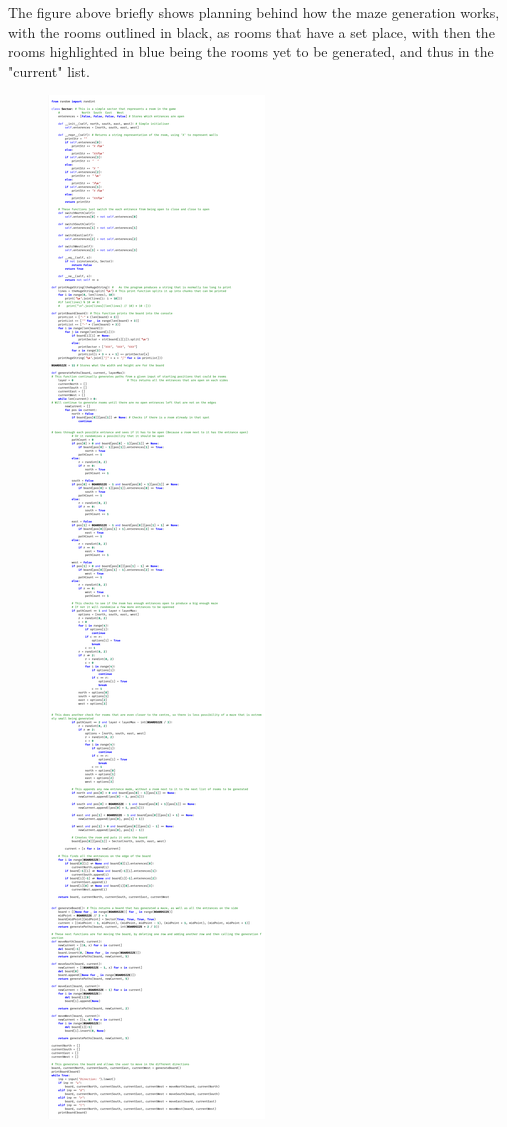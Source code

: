 \documentclass{article}
\begin{document}
            The figure above briefly shows planning behind how the maze generation works, with the rooms outlined in black, as rooms that have a set place, with then the rooms highlighted in blue being the rooms yet to be generated, and thus in the "current" list.
            \clearpage
            \begin{figure}[hbt!]
                \centerline{\includegraphics[scale=0.25, viewport=10 7668 2226 10468, clip=true]{img/Design/Maze Gen Prototype.png}}
            \end{figure}
\end{document}
